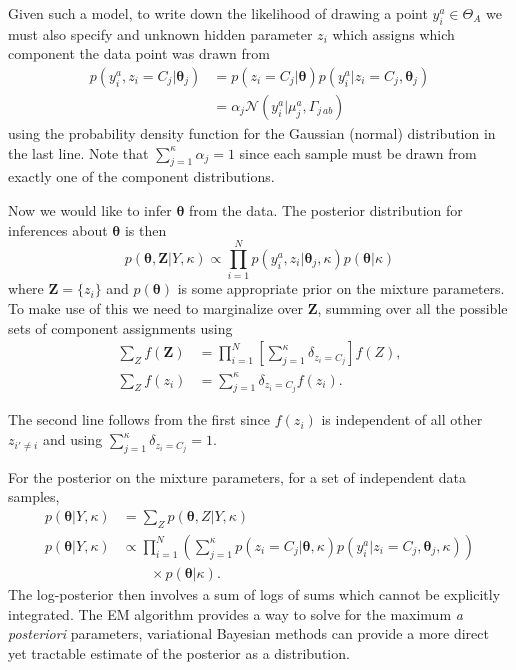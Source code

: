\documentclass[aps,showpacs,twocolumn,prd,superscriptaddress,nofootinbib]{revtex4}
\newcommand{\be}{\begin{equation}}
\newcommand{\ee}{\end{equation}}
\newcommand{\nn}{\nonumber}
\begin{document}
Given such a model, to write down the likelihood of drawing a point $y_i^a\in\Theta_A$ we must also specify and unknown hidden parameter $z_i$ which assigns which component the data point was drawn from
\begin{align}
  p(y_i^a,z_i{=}C_j|\bm\theta_j)
  &={p(z_i{=}C_j|\bm\theta)p(y_i^a|z_i{=}C_j,\bm\theta_j)}\nn\\
  &={\alpha_j\mathcal{N}(y_i^a|\mu_j^a,\Gamma_{j\,ab})}\label{eq:GMM-like}
\end{align}
using the probability density function for the Gaussian (normal) distribution in the last line.  Note that $\sum_{j=1}^\kappa\alpha_j=1$ since each sample must be drawn from exactly one of the component distributions.

Now we would like to infer $\bm\theta$ from the data. The posterior distribution for inferences about $\bm\theta$ is then
\be
p(\bm\theta,\bm Z|Y,\kappa)\propto\prod_{i=1}^Np(y_i^a,z_i|\bm\theta_j,\kappa)p(\bm\theta|\kappa)
\ee
where $\bm Z=\{z_i\}$ and $p(\bm\theta)$ is some appropriate prior on the mixture parameters.
To make use of this we need to marginalize over $\bm Z$, summing over all the possible sets of component assignments using
\begin{align}
  \sum_Z f(\bm Z)&=\prod_{i=1}^N\left[\sum_{j=1}^\kappa\delta_{z_i{=}C_j}\right]f(Z),\\
  \sum_Z f(z_i)&=\sum_{j=1}^\kappa\delta_{z_i{=}C_j}f(z_i).
\end{align}
    
The second line follows from the first since $f(z_i)$ is independent of all other $z_{i'\neq i}$ and using $\sum_{j=1}^\kappa{\delta_{z_i{=}C_j}}=1$.

For the posterior on the mixture parameters, for a set of independent data samples,
\begin{align}
  p(\bm\theta|Y,\kappa)&=\sum_{Z} p(\bm\theta,Z|Y,\kappa)\\
  p(\bm\theta|Y,\kappa)&\propto\prod_{i=1}^N\left(\sum_{j=1}^\kappa{p(z_i{=}C_j|\bm\theta,\kappa)p(y_i^a|z_i{=}C_j,\bm\theta_j,\kappa)}\right)\nn\\
  &\qquad\times p(\bm\theta|\kappa).
\end{align}
The log-posterior then involves a sum of logs of sums which cannot be explicitly integrated.  The EM algorithm provides a way to solve for the maximum \textit{a posteriori} parameters, variational Bayesian methods can provide a more direct yet tractable estimate of the posterior as a distribution.
\end{document}

